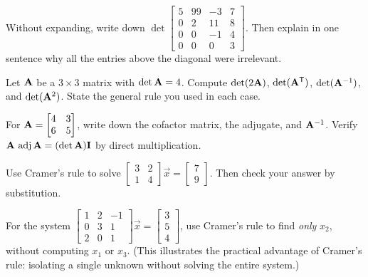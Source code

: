 \begin{exercise}\label{ch22:ex-triangular}
Without expanding, write down $\det\begin{bmatrix} 5 & 99 & -3 & 7 \\ 0 & 2 & 11 & 8 \\ 0 & 0 & -1 & 4
\\ 0 & 0 & 0 & 3\end{bmatrix}$. Then explain in one sentence why all the entries above the diagonal
were irrelevant.
\end{exercise}

\begin{exercise}\label{ch22:ex-scaling}
Let $\mathbf{A}$ be a $3\times3$ matrix with $\det\mathbf{A}=4$. Compute $\det(2\mathbf{A})$, $\det(\mathbf{A}^{\mathsf{T}})$,
$\det(\mathbf{A}^{-1})$, and $\det(\mathbf{A}^2)$. State the general rule you used in each case.
\end{exercise}

\begin{exercise}\label{ch22:ex-adj2x2}
For $\mathbf{A}=\begin{bmatrix} 4 & 3 \\ 6 & 5\end{bmatrix}$, write down the cofactor matrix, the adjugate,
and $\mathbf{A}^{-1}$. Verify $\mathbf{A}\,\operatorname{adj}\mathbf{A}=(\det\mathbf{A})\mathbf{I}$ by direct multiplication.
\end{exercise}

\begin{exercise}\label{ch22:ex-cramer2}
Use Cramer's rule to solve $\begin{bmatrix} 3 & 2 \\ 1 & 4\end{bmatrix}\vec x=\begin{bmatrix} 7 \\
9\end{bmatrix}$. Then check your answer by substitution.
\end{exercise}

\begin{exercise}\label{ch22:ex-cramer-one}
For the system $\begin{bmatrix} 1 & 2 & -1 \\ 0 & 3 & 1 \\ 2 & 0 & 1\end{bmatrix}\vec
x=\begin{bmatrix} 3 \\ 5 \\ 4\end{bmatrix}$, use Cramer's rule to find \emph{only} $x_2$, without
computing $x_1$ or $x_3$. (This illustrates the practical advantage of Cramer's rule: isolating a single unknown without solving the entire system.)
\end{exercise}

